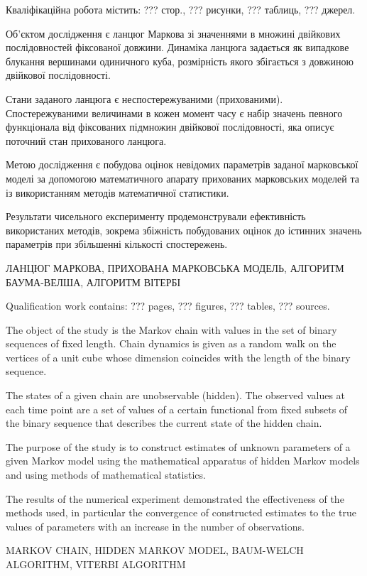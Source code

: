 
\abstractUkr

Кваліфікаційна робота містить: ??? стор., ??? рисунки, ??? таблиць, ??? джерел.

Об'єктом дослідження є ланцюг Маркова зі значеннями в множині двійкових послідовностей фіксованої довжини. Динаміка ланцюга задається як випадкове блукання вершинами одиничного куба, розмірність якого збігається з довжиною двійкової послідовності. 

Стани заданого ланцюга є неспостережуваними (прихованими). Спостережуваними величинами в кожен момент часу є набір значень певного функціонала від фіксованих підмножин двійкової послідовності, яка описує поточний стан прихованого ланцюга.

Метою дослідження є побудова оцінок невідомих параметрів заданої марковської моделі за допомогою математичного апарату прихованих марковських моделей та із використанням методів математичної статистики. 

Результати чисельного експерименту продемонстрували ефективність використаних методів, зокрема збіжність побудованих оцінок до істинних значень параметрів при збільшенні кількості спостережень.

\MakeUppercase{ЛАНЦЮГ МАРКОВА, ПРИХОВАНА МАРКОВСЬКА МОДЕЛЬ, АЛГОРИТМ БАУМА-ВЕЛША, АЛГОРИТМ ВІТЕРБІ}

\abstractEng

Qualification work contains: ??? pages, ??? figures, ??? tables, ??? sources.

The object of the study is the Markov chain with values in the set of binary sequences of fixed length. Chain dynamics is given as a random walk on the vertices of a unit cube whose dimension coincides with the length of the binary sequence.

The states of a given chain are unobservable (hidden). The observed values at each time point are a set of values of a certain functional from fixed subsets of the binary sequence that describes the current state of the hidden chain.

The purpose of the study is to construct estimates of unknown parameters of a given Markov model using the mathematical apparatus of hidden Markov models and using methods of mathematical statistics.

The results of the numerical experiment demonstrated the effectiveness of the methods used, in particular the convergence of constructed estimates to the true values of parameters with an increase in the number of observations.

\MakeUppercase{MARKOV CHAIN, HIDDEN MARKOV MODEL, BAUM-WELCH ALGORITHM, VITERBI ALGORITHM}

\clearpage